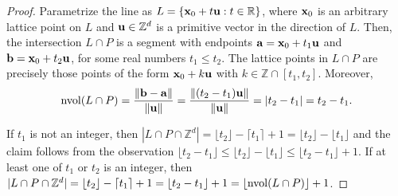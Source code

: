 
    

\begin{proof}
Parametrize the line as $L = \{\mathbf{x}_0 + t\mathbf{u} : t \in \mathbb{R}\}$, where $\mathbf{x}_0$ is an arbitrary lattice point on $L$ and $\mathbf{u} \in \mathbb{Z}^d$ is a primitive vector in the direction of $L$. Then, the intersection $L \cap P$ is a segment with endpoints $\mathbf{a} = \mathbf{x}_0 + t_1\mathbf{u}$ and $\mathbf{b} = \mathbf{x}_0 + t_2\mathbf{u}$, for some real numbers $t_1 \leq t_2$.
The lattice points in $L \cap P$ are precisely those points of the form $\mathbf{x}_0 + k\mathbf{u}$ with $k \in \mathbb{Z} \cap [t_1, t_2]$. Moreover,
\[
\operatorname{nvol}(L \cap P) = \frac{\|\mathbf{b} - \mathbf{a}\|}{\|\mathbf{u}\|} = \frac{\|(t_2 - t_1) \mathbf{u}\|}{\|\mathbf{u}\|} = |t_2 - t_1|=t_2-t_1.
\]

If $t_1$ is not an integer, then $|L \cap P \cap \mathbb{Z}^d| 
= \lfloor t_2 \rfloor - \lceil t_1 \rceil + 1 = \lfloor t_2 \rfloor - \lfloor t_1 \rfloor$
and the claim follows from the observation
$\lfloor t_2-t_1 \rfloor \leq \lfloor t_2 \rfloor - \lfloor t_1 \rfloor \leq \lfloor t_2-t_1 \rfloor +1$. If at least one of $t_1$ or $t_2$ is an integer, then
$|L \cap P \cap \mathbb{Z}^d| = \lfloor t_2 \rfloor - \lceil t_1 \rceil + 1 = \lfloor t_2 - t_1 \rfloor + 1=\lfloor \operatorname{nvol}(L \cap P) \rfloor +1$.
\end{proof}

